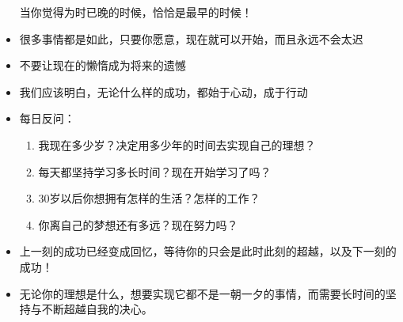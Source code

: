\documentclass[UTF8,a4paper,8pt]{ctexbook}
\begin{document}
\begin{itemize}
			当你觉得为时已晚的时候，恰恰是最早的时候！
			\item 很多事情都是如此，只要你愿意，现在就可以开始，而且永远不会太迟
			\item 不要让现在的懒惰成为将来的遗憾
			\item 我们应该明白，无论什么样的成功，都始于心动，成于行动
			\item 每日反问：
				\begin{enumerate}
					\item 我现在多少岁？决定用多少年的时间去实现自己的理想？
					\item 每天都坚持学习多长时间？现在开始学习了吗？
					\item 30岁以后你想拥有怎样的生活？怎样的工作？
					\item 你离自己的梦想还有多远？现在努力吗？
				\end{enumerate} 
			\item 上一刻的成功已经变成回忆，等待你的只会是此时此刻的超越，以及下一刻的成功！
			\item 无论你的理想是什么，想要实现它都不是一朝一夕的事情，而需要长时间的坚持与不断超越自我的决心。
			

\end{itemize}
\end{document}
